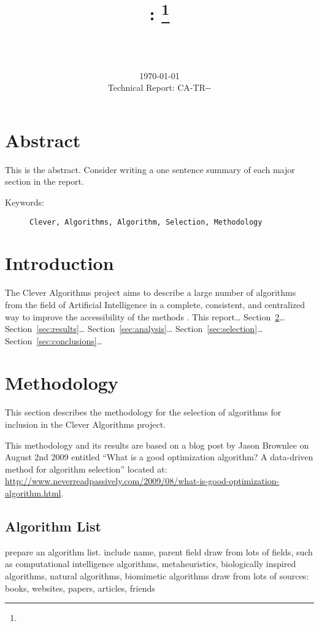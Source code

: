 \documentclass[a4paper, 11pt]{article}
\title{{\myreporttitle}: {\myreportsubtitle}\footnote{\myreportlicense}}
\author{\myreportauthor\\{\myreportemail}\\\small\myreportproject}
\date{\today\\{\small{Technical Report: CA-TR-{\myreportdate}-\myreportversion}}}
\begin{document}
\maketitle

\section*{Abstract} 
This is the abstract. Consider writing a one sentence summary of each major section in the report.

\begin{description}
	\item[Keywords:] {\small\texttt{Clever, Algorithms, Algorithm, Selection, Methodology}}
\end{description} 

\section{Introduction}
\label{sec:introduction}
The Clever Algorithms project aims to describe a large number of algorithms from the field of Artificial Intelligence in a complete, consistent, and centralized way to improve the accessibility of the methods \cite{Brownlee2010}. 
This report\ldots
Section~\ref{sec:methodology}\ldots
Section~\ref{sec:results}\ldots
Section~\ref{sec:analysis}\ldots
Section~\ref{sec:selection}\ldots
Section~\ref{sec:conclusions}\ldots

\section{Methodology}
\label{sec:methodology}
This section describes the methodology for the selection of algorithms for inclusion in the Clever Algorithms project.

This methodology and its results are based on a blog post by Jason Brownlee on August 2nd 2009 entitled ``What is a good optimization algorithm? A data-driven method for algorithm selection'' located at: \url{http://www.neverreadpassively.com/2009/08/what-is-good-optimization-algorithm.html}.

\subsection{Algorithm List}
prepare an algorithm list. include name, parent field
draw from lots of fields, such as computational intelligence algorithms, metaheuristics, biologically inspired algorithms, natural algorithms, biomimetic algorithms
draw from lots of sources: books, websites, papers, articles, friends
\end{document}
